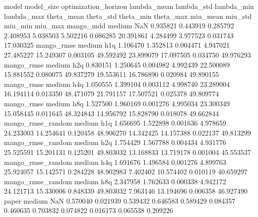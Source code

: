             model model_size optimization_horizon  lambda_mean  lambda_std  lambda_min  lambda_max  theta_mean  theta_std  theta_min  theta_max  miu_mean   miu_std  miu_min   miu_max
        mango_mdd     medium                  NaN     0.935821    0.443919    0.285792    2.408953    5.038503   5.502216   0.086285  20.391861  4.284499  3.977523 0.031743 17.030325
       mango_rmse     medium                  h1q     1.106470    1.352813    0.004471    4.947021   27.485227  15.249307   0.003105  49.592492 23.899079 17.097505 0.034750 49.976293
       mango_rmse     medium                  h2q     0.830151    1.250645    0.004982    4.992439   22.500089  15.881552   0.080075  49.837279 19.553611 16.786890 0.020984 49.890155
       mango_rmse     medium                  h4q     1.050555    1.399104    0.003112    4.998740   23.289004  16.194114   0.013350  48.471079 21.791157 17.507521 0.025378 49.809774
       mango_rmse     medium                  h8q     1.527500    1.960169    0.001276    4.995034   23.300349  15.058445   0.011645  48.324843 14.956792 15.828790 0.018078 49.662844
mango_rmse_random     medium                  h1q     1.656695    1.522898    0.001636    4.978659   24.233003  14.254641   0.120458  48.906270 14.342425 14.157388 0.022137 49.813299
mango_rmse_random     medium                  h2q     1.754429    1.567788    0.004434    4.931776   25.525591  15.201131   0.125201  49.803032 13.168833 13.719178 0.001004 45.553537
mango_rmse_random     medium                  h4q     1.691676    1.496584    0.001276    4.899763   25.924057  15.142571   0.284228  48.902983  7.402402 10.574402 0.010119 40.659297
mango_rmse_random     medium                  h8q     2.347958    1.762633    0.000338    4.942172   24.121713  15.330006   0.848339  49.803032  7.963146 13.194696 0.006358 46.927490
            paper     medium                  NaN     0.570040    0.021939    0.539432    0.646583    0.589429   0.084357   0.460635   0.703832  0.074822  0.016173 0.065538  0.209226